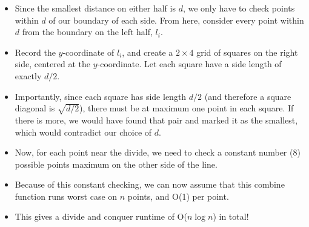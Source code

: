 \documentclass[10pt]{article}
\begin{document}
\begin{itemize}
    \item Since the smallest distance on either half is $d$, we only have to check points within $d$ of our boundary of each side.  From here, consider every point within $d$ from the boundary on the left half, $l_i$.
    \item Record the $y$-coordinate of $l_i$, and create a $2 \times 4$ grid of squares on the right side, centered at the $y$-coordinate.  Let each square have a side length of exactly $d / 2$.
    \begin{center}
    \end{center}
    \item Importantly, since each square has side length $d / 2$ (and therefore a square diagonal is $\sqrt{d / 2}$), there must be at maximum one point in each square.  If there is more, we would have found that pair and marked it as the smallest, which would contradict our choice of $d$.
    \item Now, for each point near the divide, we need to check a constant number (8) possible points maximum on the other side of the line.
    \item Because of this constant checking, we can now assume that this combine function runs worst case on $n$ points, and O(1) per point.
    \item This gives a divide and conquer runtime of O($n\log n$) in total!
\end{itemize}
\end{document}
